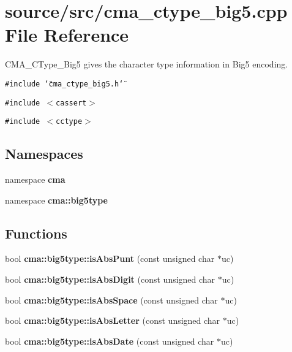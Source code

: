 \section{source/src/cma\_\-ctype\_\-big5.cpp File Reference}
\label{cma__ctype__big5_8cpp}
CMA\_\-CType\_\-Big5 gives the character type information in Big5 encoding. 

{\tt \#include \char`\"{}cma\_\-ctype\_\-big5.h\char`\"{}}\par
{\tt \#include $<$cassert$>$}\par
{\tt \#include $<$cctype$>$}\par
\subsection*{Namespaces}
\begin{CompactItemize}
\item 
namespace \textbf{cma}
\item 
namespace \textbf{cma::big5type}
\end{CompactItemize}
\subsection*{Functions}
\begin{CompactItemize}
\item 
bool {\bf cma::big5type::isAbsPunt} (const unsigned char $\ast$uc)
\item 
bool {\bf cma::big5type::isAbsDigit} (const unsigned char $\ast$uc)
\item 
bool {\bf cma::big5type::isAbsSpace} (const unsigned char $\ast$uc)
\item 
bool {\bf cma::big5type::isAbsLetter} (const unsigned char $\ast$uc)
\item 
bool {\bf cma::big5type::isAbsDate} (const unsigned char $\ast$uc)
\end{CompactItemize}
